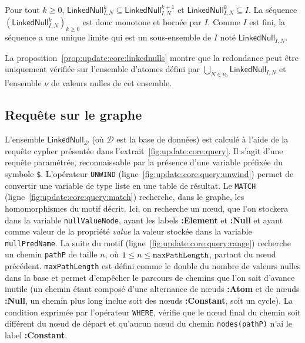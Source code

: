 
\begin{proposition}
	\label{prop:update:core:linkednulls}
	Pour tout $k \geq 0$, $\textsf{LinkedNull}^k_{I,N} \subseteq \textsf{LinkedNull}^{k+1}_{I,N}$ et $\textsf{LinkedNull}^k_{I,N} \subseteq I$.
	La séquence $(\textsf{LinkedNull}^k_{I,N})_{k \ge 0}$ est donc monotone et bornée par $I$.
	Comme $I$ est fini, la séquence a une unique limite qui est un sous-ensemble de $I$ noté $\textsf{LinkedNull}_{I,N}$.
\end{proposition}

La proposition~\ref{prop:update:core:linkednulls} montre que la redondance peut être uniquement vérifiée sur l'ensemble d'atomes défini par $\bigcup_{N \in \nu_0}\textsf{LinkedNull}_{I,N}$ et l'ensemble $\nu$ de valeurs nulles de cet ensemble.

\subsection{Requête sur le graphe}
L'ensemble $\textsf{LinkedNull}_{\mathcal{D}}$ (où $\mathcal{D}$ est la base de données) est calculé à l'aide de la requête \gls{cypher} présentée dans l'extrait~\ref{fig:update:core:query}.
Il s'agit d'une requête paramétrée, reconnaissable par la présence d'une variable préfixée du symbole \verb|$|.
L'opérateur \verb|UNWIND| (ligne~\ref{fig:update:core:query:unwind}) permet de convertir une variable de type liste en une table de résultat.
Le \verb|MATCH| (ligne~\ref{fig:update:core:query:match}) recherche, dans le graphe, les homomorphismes du motif décrit.
Ici, on recherche un nœud, que l'on stockera dans la variable \verb|nullValueNode|, ayant les labels \textbf{:Element} et \textbf{:Null} et ayant comme valeur de la propriété \textit{value} la valeur stockée dans la variable \verb|nullPredName|.
La suite du motif (ligne~\ref{fig:update:core:query:range}) recherche un chemin \verb|pathP| de taille $n$, où $1 \leq n \leq \verb|maxPathLength|$, partant du nœud précédent.
\verb|maxPathLength| est défini comme le double du nombre de valeurs nulles dans la base et permet d'empêcher le parcours de chemins que l'on sait d'avance inutile (un chemin étant composé d'une alternance de nœuds \textbf{:Atom} et de nœuds \textbf{:Null}, un chemin plus long inclue soit des nœuds \textbf{:Constant}, soit un cycle).
La condition exprimée par l'opérateur \verb|WHERE|, vérifie que le nœud final du chemin soit différent du nœud de départ et qu'aucun nœud du chemin \verb|nodes(pathP)| n'ai le label \textbf{:Constant}.


